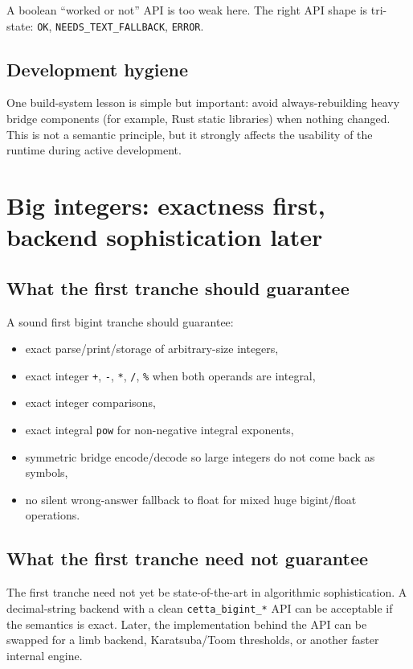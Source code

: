 \documentclass[11pt]{article}
\begin{document}
A boolean ``worked or not'' API is too weak here. The right API shape is tri-state: \texttt{OK}, \texttt{NEEDS\_TEXT\_FALLBACK}, \texttt{ERROR}.

\subsection{Development hygiene}

One build-system lesson is simple but important: avoid always-rebuilding heavy bridge components (for example, Rust static libraries) when nothing changed. This is not a semantic principle, but it strongly affects the usability of the runtime during active development.

\section{Big integers: exactness first, backend sophistication later}

\subsection{What the first tranche should guarantee}

A sound first bigint tranche should guarantee:
\begin{itemize}
    \item exact parse/print/storage of arbitrary-size integers,
    \item exact integer \texttt{+}, \texttt{-}, \texttt{*}, \texttt{/}, \texttt{\%} when both operands are integral,
    \item exact integer comparisons,
    \item exact integral \texttt{pow} for non-negative integral exponents,
    \item symmetric bridge encode/decode so large integers do not come back as symbols,
    \item no silent wrong-answer fallback to float for mixed huge bigint/float operations.
\end{itemize}

\subsection{What the first tranche need not guarantee}

The first tranche need not yet be state-of-the-art in algorithmic sophistication. A decimal-string backend with a clean \texttt{cetta\_bigint\_*} API can be acceptable if the semantics is exact. Later, the implementation behind the API can be swapped for a limb backend, Karatsuba/Toom thresholds, or another faster internal engine.
\end{document}

